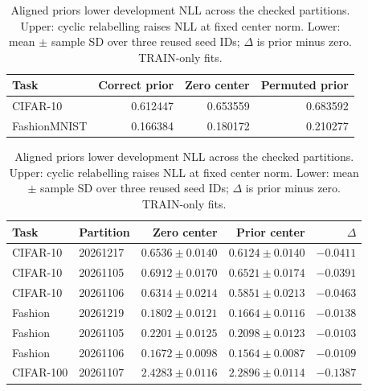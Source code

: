 \begin{table}[!htb]\centering\small\setlength{\tabcolsep}{3pt}
\caption{Aligned priors lower development NLL across the checked partitions. Upper: cyclic relabelling raises NLL at fixed center norm. Lower: mean $\pm$ sample SD over three reused seed IDs; $\Delta$ is prior minus zero. TRAIN-only fits.}\label{tab:mechanism}\label{tab:partitiondev}
\begin{tabular}{lrrr}\toprule
Task & Correct prior & Zero center & Permuted prior\\\midrule
CIFAR-10 & 0.612447 & 0.653559 & 0.683592\\
FashionMNIST & 0.166384 & 0.180172 & 0.210277\\\bottomrule
\end{tabular}
\par\medskip
\begin{tabular}{llrrr}
\toprule
Task & Partition & Zero center & Prior center & $\Delta$ \\
\midrule
CIFAR-10 & 20261217 & $0.6536\pm0.0140$ & $0.6124\pm0.0140$ & $-0.0411$ \\
CIFAR-10 & 20261105 & $0.6912\pm0.0170$ & $0.6521\pm0.0174$ & $-0.0391$ \\
CIFAR-10 & 20261106 & $0.6314\pm0.0214$ & $0.5851\pm0.0213$ & $-0.0463$ \\
Fashion & 20261219 & $0.1802\pm0.0121$ & $0.1664\pm0.0116$ & $-0.0138$ \\
Fashion & 20261105 & $0.2201\pm0.0125$ & $0.2098\pm0.0123$ & $-0.0103$ \\
Fashion & 20261106 & $0.1672\pm0.0098$ & $0.1564\pm0.0087$ & $-0.0109$ \\
CIFAR-100 & 20261107 & $2.4283\pm0.0116$ & $2.2896\pm0.0114$ & $-0.1387$ \\
\bottomrule
\end{tabular}
\end{table}
